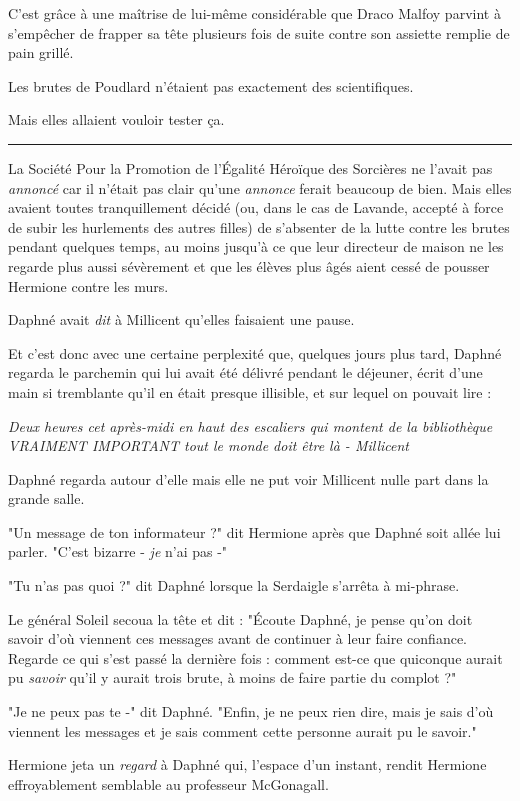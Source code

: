 C'est grâce à une maîtrise de lui-même considérable que Draco Malfoy parvint à s'empêcher de frapper sa tête plusieurs fois de suite contre son assiette remplie de pain grillé.

Les brutes de Poudlard n'étaient pas exactement des scientifiques.

Mais elles allaient vouloir tester ça.
\par\noindent\rule{\textwidth}{0.4pt}
La Société Pour la Promotion de l'Égalité Héroïque des Sorcières ne l'avait pas \emph{annoncé}  car il n'était pas clair qu'une \emph{annonce}  ferait beaucoup de bien. Mais elles avaient toutes tranquillement décidé (ou, dans le cas de Lavande, accepté à force de subir les hurlements des autres filles) de s'absenter de la lutte contre les brutes pendant quelques temps, au moins jusqu'à ce que leur directeur de maison ne les regarde plus aussi sévèrement et que les élèves plus âgés aient cessé de pousser Hermione contre les murs.

Daphné avait \emph{dit}  à Millicent qu'elles faisaient une pause.

Et c'est donc avec une certaine perplexité que, quelques jours plus tard, Daphné regarda le parchemin qui lui avait été délivré pendant le déjeuner, écrit d'une main si tremblante qu'il en était presque illisible, et sur lequel on pouvait lire :

\emph{Deux heures cet après-midi en haut des escaliers qui montent de la bibliothèque VRAIMENT IMPORTANT tout le monde doit être là - Millicent} 

Daphné regarda autour d'elle mais elle ne put voir Millicent nulle part dans la grande salle.

"Un message de ton informateur ?" dit Hermione après que Daphné soit allée lui parler. "C'est bizarre - \emph{je}  n'ai pas -"

"Tu n'as pas quoi ?" dit Daphné lorsque la Serdaigle s'arrêta à mi-phrase.

Le général Soleil secoua la tête et dit : "Écoute Daphné, je pense qu'on doit savoir d'où viennent ces messages avant de continuer à leur faire confiance. Regarde ce qui s'est passé la dernière fois : comment est-ce que quiconque aurait pu \emph{savoir}  qu'il y aurait trois brute, à moins de faire partie du complot ?"

"Je ne peux pas te -" dit Daphné. "Enfin, je ne peux rien dire, mais je sais d'où viennent les messages et je sais comment cette personne aurait pu le savoir."

Hermione jeta un \emph{regard}  à Daphné qui, l'espace d'un instant, rendit Hermione effroyablement semblable au professeur McGonagall.

